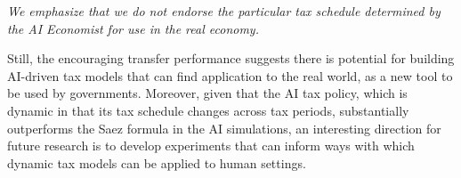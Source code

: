 \medskip

\emph{We emphasize that we do not endorse the particular tax schedule determined by the AI Economist for use in the real economy.}

\medskip

Still, the encouraging transfer performance suggests there is potential for building AI-driven tax models that can find application to the real world, as a new tool to be used by governments. Moreover, given that the AI tax policy, which is dynamic in that its tax schedule changes across tax periods, substantially outperforms the Saez formula in the AI simulations, an interesting direction for future research is to develop experiments that can inform ways with which dynamic tax models can be applied to human settings.